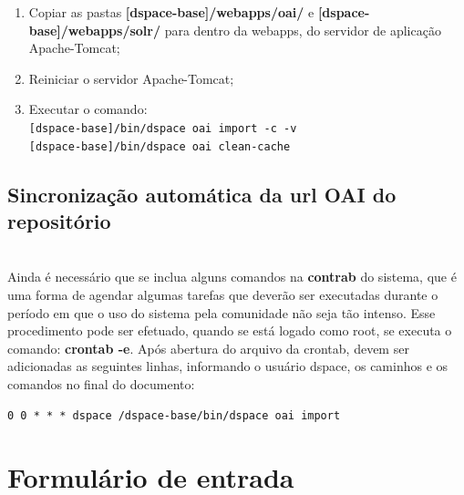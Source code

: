\documentclass[12pt,hidelinks]{article}
\begin{document}
        
        \begin{enumerate}
            \item Copiar as pastas \textbf{[dspace-base]/webapps/oai/} e \textbf{[dspace-base]/webapps/solr/} para dentro da webapps, do servidor de aplicação Apache-Tomcat;
            
            \item Reiniciar o servidor Apache-Tomcat;
            
            \item Executar o comando:\\
             \texttt{[dspace-base]/bin/dspace oai import -c -v}\\
             \texttt{[dspace-base]/bin/dspace oai clean-cache}

        \end{enumerate}
        
\newpage
    \subsection{Sincronização automática da url OAI do repositório}\\
    Ainda é necessário que se inclua alguns comandos na \textbf{contrab} do sistema, que é uma forma de agendar algumas tarefas que deverão ser executadas durante o período em que o uso do sistema pela comunidade não seja tão intenso. Esse procedimento pode ser efetuado, quando se está logado como root, se executa o comando: \textbf{crontab -e}. Após abertura do arquivo da crontab, devem ser adicionadas as seguintes linhas, informando o usuário dspace, os caminhos e os comandos no final do documento:
    
    \begin{verbatim}
0 0 * * * dspace /dspace-base/bin/dspace oai import
    \end{verbatim}

\newpage
\section{Formulário de entrada}
\newpage
\end{document}
